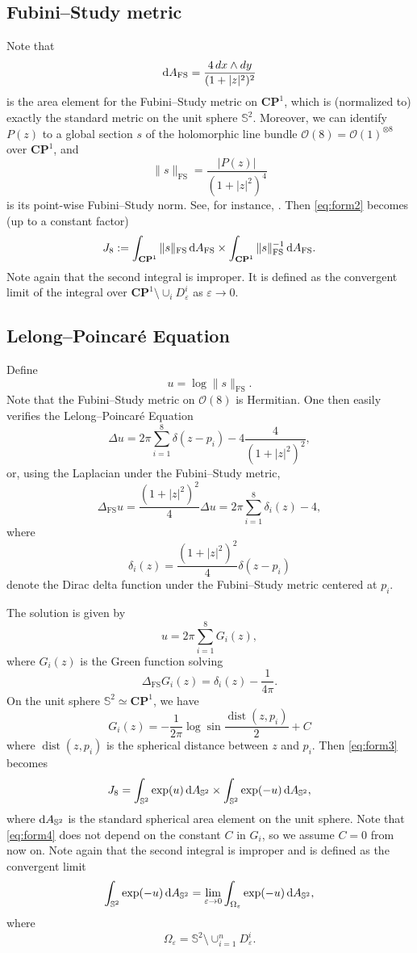 \documentclass[a4paper]{amsart}
\newcommand{\CP}{\mathbf{CP}}
\newcommand{\cO}{\mathcal{O}}
\newcommand{\FS}{\text{FS}}
\newcommand{\uS}{\mathbb{S}}
\newcommand{\sph}{{\uS^2}}
\newcommand{\laplace}{\Delta}
\newcommand{\dist}{\operatorname{dist}}
\newcommand{\dd}{{\rm d}}
\theoremstyle{plain} %
\theoremstyle{definition} %
\theoremstyle{remark}
\begin{document}
\subsection{Fubini--Study metric}

Note that
\[
	\dd A_\FS = \frac{4 \, dx \wedge dy}{(1+|z|^2)^2}
\]
is the area element for the Fubini--Study metric on $\CP^1$, which is
(normalized to) exactly the standard metric on the unit sphere $\uS^2$.
Moreover, we can identify $P(z)$ to a global section $s$ of the holomorphic
line bundle $\cO(8) = \cO(1)^{\otimes 8}$ over $\CP^1$, and
\[
	\|s\|_\FS = \frac{|P(z)|}{(1+|z|^2)^4}
\]
is its point-wise Fubini--Study norm.  See, for instance,
\cite{huybrechts2005}.  Then \eqref{eq:form2} becomes (up to a constant factor)
\begin{equation}\label{eq:form3}
	J_8 := 
	\int_{\CP^1} \| s \|_\FS \, \dd A_\FS \times
	\int_{\CP^1} \| s \|_\FS^{-1} \, \dd A_\FS. 
\end{equation}
Note again that the second integral is improper.  It is defined as the
convergent limit of the integral over $\CP^1 \setminus \cup_i D^i_\varepsilon$
as $\varepsilon \to 0$.

\subsection{Lelong--Poincar\'e Equation}

Define
\[
	u = \log \| s \|_\FS.
\]
Note that the Fubini--Study metric on $\cO(8)$ is Hermitian.  One then easily verifies the
Lelong--Poincar\'e Equation
\[
	\laplace u = 2\pi \sum_{i=1}^8 \delta(z-p_i) - 4\frac{4}{(1+|z|^2)^2},
\]
or, using the Laplacian under the Fubini--Study metric,
\[
	\laplace_\FS u = \frac{(1+|z|^2)^2}{4} \laplace u
	= 2\pi \sum_{i=1}^8 \delta_i(z) - 4,
\]
where
\[
	\delta_i(z) = \frac{(1+|z|^2)^2}{4} \delta(z-p_i)
\]
denote the Dirac delta function under the Fubini--Study metric centered at
$p_i$.

The solution is given by
\[
	u = 2\pi \sum_{i = 1}^8 G_i(z),
\]
where $G_i(z)$ is the Green function solving
\begin{equation}\label{eq:laplaceG}
	\laplace_\FS G_i(z) = \delta_i(z) - \frac{1}{4\pi}.
\end{equation}
On the unit sphere $\uS^2 \simeq \CP^1$, we have
\[
	G_i(z) = -\frac{1}{2\pi} \log \sin \frac{\dist(z, p_i)}{2} + C
\]
where $\dist(z, p_i)$ is the spherical distance between $z$ and $p_i$.  Then
\eqref{eq:form3} becomes
\begin{equation}\label{eq:form4}
	J_8 =
	\int_{\uS^2} \exp(u) \, \dd A_\sph \times
	\int_{\uS^2} \exp(-u) \, \dd A_\sph,
\end{equation}
where $\dd A_\sph$ is the standard spherical area element on the unit sphere.
Note that \eqref{eq:form4} does not depend on the constant $C$ in $G_i$, so we
assume $C=0$ from now on.  Note again that the second integral is improper and
is defined as the convergent limit
\[
	\int_{\uS^2} \exp(-u) \, \dd A_\sph = \lim_{\varepsilon \to 0}
	\int_{\Omega_\varepsilon} \exp(-u) \, \dd A_\sph,
\]
where
\[
	\Omega_\varepsilon = \uS^2 \setminus \cup_{i=1}^n D^i_\varepsilon.
\]
\end{document}
